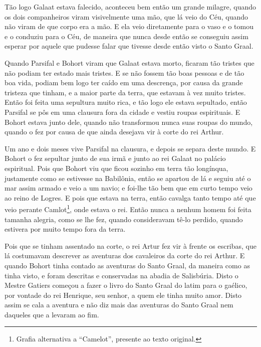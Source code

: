 Tão logo Galaat estava falecido, aconteceu bem então um grande milagre, quando
os dois companheiros viram visivelmente uma mão, que lá veio do Céu, quando não
viram de que corpo era a mão. E ela veio diretamente para o vaso e o tomou e o
conduziu para o Céu, de maneira que nunca desde então se conseguiu assim
esperar por aquele que pudesse falar que tivesse desde então visto o Santo
Graal. 

Quando Parsifal e Bohort viram que Galaat estava morto, ficaram tão tristes que
não podiam ter estado mais tristes. E se não fossem tão boas pessoas e de tão
boa vida, podiam bem logo ter caído em uma descrença, por causa da grande
tristeza que tinham, e a maior parte da terra, que estavam à vez muito tristes.
Então foi feita uma sepultura muito rica, e tão logo ele estava sepultado,
então Parsifal se pôs em uma clausura fora da cidade e vestiu roupas
espirituais. E Bohort estava junto dele, quando não transformou nunca suas
roupas do mundo, quando o fez por causa de que ainda desejava vir à corte do
rei Arthur.

Um ano e dois meses vive Parsifal na clausura, e depois se separa deste mundo.
E Bohort o fez sepultar junto de sua irmã e junto ao rei Galaat no palácio
espiritual. Pois que Bohort viu que ficou sozinho em terra tão longínqua,
justamente como se estivesse na Babilônia, então se apartou de lá e seguiu até
o mar assim armado e veio a um navio; e foi-lhe tão bem que em curto tempo veio
ao reino de Logres. E pois que estava na terra, então cavalga tanto tempo até
que veio perante Camlot\footnote{ Grafia alternativa a “Camelot”, presente ao
texto original.},  onde estava o rei. Então nunca a nenhum homem
foi feita tamanha alegria, como se lhe fez, quando consideravam tê-lo perdido,
quando estivera por muito tempo fora da terra.

Pois que se tinham assentado na corte, o rei Artur fez vir à frente os escribas,
que lá costumavam descrever as aventuras dos cavaleiros da corte do rei Arthur.
E quando Bohort tinha contado as aventuras do Santo Graal, da maneira como as
tinha visto, e foram descritas e conservadas na abadia de Salisbúria. Disto o
Mestre Gatiers começou a fazer o livro do Santo Graal do latim para o gaélico,
por vontade do rei Henrique, seu senhor, a quem ele tinha muito amor. Disto
assim se cala a aventura e não diz mais das aventuras do Santo Graal nem
daqueles que a levaram ao fim. 



